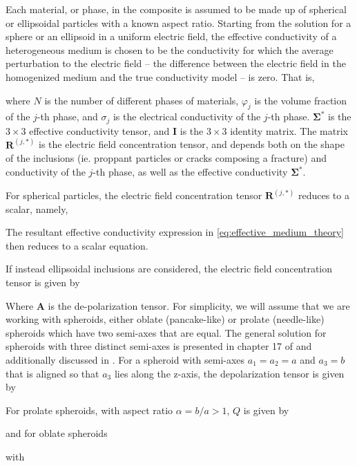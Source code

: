Each material, or phase, in the composite is assumed to be made up of spherical or ellipsoidal particles with a known aspect ratio. Starting from the solution for a sphere or an ellipsoid in a uniform electric field, the effective conductivity of a heterogeneous medium is chosen to be the conductivity for which the average perturbation to the electric field -- the difference between the electric field in the homogenized medium and the true conductivity model -- is zero. That is,


where $N$ is the number of different phases of materials, $\varphi_j$ is the volume fraction of the $j$-th phase, and $\sigma_j$ is the electrical conductivity of the $j$-th phase. $\boldsymbol{\Sigma^*}$ is the $3 \times 3$ effective conductivity tensor, and $\mathbf{I}$ is the $3 \times 3$ identity matrix. The matrix $\mathbf{R}^{(j,*)}$ is the electric field concentration tensor, and depends both on the shape of the inclusions (ie. proppant particles or cracks composing a fracture) and conductivity of the $j$-th phase, as well as the effective conductivity $\boldsymbol{\Sigma^*}$.

For spherical particles, the electric field concentration tensor $\mathbf{R}^{(j,*)}$ reduces to a scalar, namely,


The resultant effective conductivity expression in \ref{eq:effective_medium_theory} then reduces to a scalar equation.

If instead ellipsoidal inclusions are considered, the electric field concentration tensor is given by


Where $\mathbf{A}$ is the de-polarization tensor. For simplicity, we will assume that we are working with spheroids, either oblate (pancake-like) or prolate (needle-like) spheroids which have two semi-axes that are equal. The general solution for spheroids with three distinct semi-axes is presented in chapter 17 of \cite{Torquato2002} and additionally discussed in \cite{Berryman2013}. For a spheroid with semi-axes $a_1 = a_2 = a$ and $a_3 = b$ that is aligned so that $a_3$ lies along the z-axis, the depolarization tensor is given by


For prolate spheroids, with aspect ratio $\alpha = b/a > 1$, $Q$ is given by


and for oblate spheroids


with

